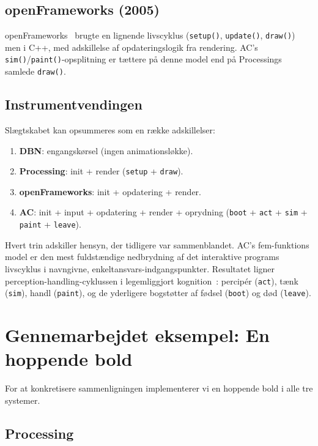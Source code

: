 \documentclass[10pt,letterpaper,twocolumn]{article}
\begin{document}
\subsection{openFrameworks (2005)}

openFrameworks~\citep{openframeworks2005} brugte en lignende livscyklus (\texttt{setup()}, \texttt{update()}, \texttt{draw()}) men i C++, med adskillelse af opdateringslogik fra rendering. AC's \texttt{sim()}/\texttt{paint()}-opsplitning er tættere på denne model end på Processings samlede \texttt{draw()}.

\subsection{Instrumentvendingen}

Slægtskabet kan opsummeres som en række adskillelser:

\begin{enumerate}
  \item \textbf{DBN}: engangskørsel (ingen animationsløkke).
  \item \textbf{Processing}: init + render (\texttt{setup} + \texttt{draw}).
  \item \textbf{openFrameworks}: init + opdatering + render.
  \item \textbf{AC}: init + input + opdatering + render + oprydning (\texttt{boot} + \texttt{act} + \texttt{sim} + \texttt{paint} + \texttt{leave}).
\end{enumerate}

Hvert trin adskiller hensyn, der tidligere var sammenblandet. AC's fem-funktions model er den mest fuldstændige nedbrydning af det interaktive programs livscyklus i navngivne, enkeltansvars-indgangspunkter. Resultatet ligner perception-handling-cyklussen i legemliggjort kognition~\citep{varela1991embodied}: percipér (\texttt{act}), tænk (\texttt{sim}), handl (\texttt{paint}), og de yderligere bogstøtter af fødsel (\texttt{boot}) og død (\texttt{leave}).


\section{Gennemarbejdet eksempel: En hoppende bold}
\label{sec:example}

For at konkretisere sammenligningen implementerer vi en hoppende bold i alle tre systemer.

\subsection{Processing}
\end{document}

